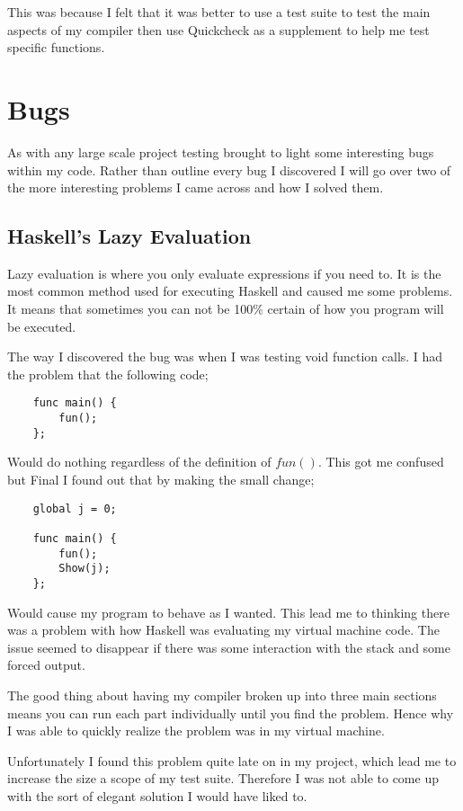 This was because I felt that it was better to use a test suite to test the main aspects of my compiler then use Quickcheck as a supplement to help me test specific functions.  

\section{Bugs} 

As with any large scale project testing brought to light some interesting bugs within my code. Rather than outline every bug I discovered I will go over two of the more interesting problems I came across and how I solved them.


\subsection{Haskell's Lazy Evaluation}

Lazy evaluation is where you only evaluate expressions if you need to. It is the most common method used for executing Haskell and caused me some problems. It means that sometimes you can not be 100\% certain of how you program will be executed.

The way I discovered the bug was when I was testing void function calls. I had the problem that the following code;

\begin{lstlisting}
	func main() {
		fun();
	};
\end{lstlisting}

Would do nothing regardless of the definition of $fun()$. This got me confused but Final I found out that by making the small change;

\begin{lstlisting}
	global j = 0;
	
	func main() {
		fun();
		Show(j);
	};
\end{lstlisting}

Would cause my program to behave as I wanted. This lead me to thinking there was a problem with how Haskell was evaluating my virtual machine code. The issue seemed to disappear if there was some interaction with the stack and some forced output.

The good thing about having my compiler broken up into three main sections means you can run each part individually until you find the problem. Hence why I was able to quickly realize the problem was in my virtual machine.   

Unfortunately I found this problem quite late on in my project, which lead me to increase the size a scope of my test suite. Therefore I was not able to come up with the sort of elegant solution I would have liked to. 


